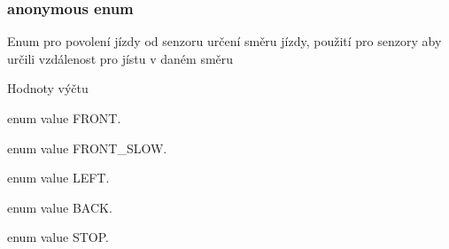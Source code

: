 \subsubsection[{\texorpdfstring{anonymous enum}{anonymous enum}}]{\setlength{\rightskip}{0pt plus 5cm}anonymous enum\hspace{0.3cm}{\ttfamily [private]}}\hypertarget{class_sekacka_a4b9f99f468351377c74f1906012dddce}{}\label{class_sekacka_a4b9f99f468351377c74f1906012dddce}
Enum pro povolení jízdy od senzoru určení směru jízdy, použití pro senzory aby určili vzdálenost pro jístu v daném směru \begin{Desc}
\item[Hodnoty výčtu]\par
\begin{description}
\item[{\em 
F\+R\+O\+NT\hypertarget{class_sekacka_a4b9f99f468351377c74f1906012dddcead823d74f46614cb9d4c6256a47d52427}{}\label{class_sekacka_a4b9f99f468351377c74f1906012dddcead823d74f46614cb9d4c6256a47d52427}
}]enum value F\+R\+O\+NT. \item[{\em 
F\+R\+O\+N\+T\+\_\+\+S\+L\+OW\hypertarget{class_sekacka_a4b9f99f468351377c74f1906012dddcea48ecf5835232244136c4f81df5843716}{}\label{class_sekacka_a4b9f99f468351377c74f1906012dddcea48ecf5835232244136c4f81df5843716}
}]enum value F\+R\+O\+N\+T\+\_\+\+S\+L\+OW. \item[{\em 
L\+E\+FT\hypertarget{class_sekacka_a4b9f99f468351377c74f1906012dddcea84850430a560bac207f0c6c43e5f6db3}{}\label{class_sekacka_a4b9f99f468351377c74f1906012dddcea84850430a560bac207f0c6c43e5f6db3}
}]enum value L\+E\+FT. \item[{\em 
B\+A\+CK\hypertarget{class_sekacka_a4b9f99f468351377c74f1906012dddcea1e7fc60b9bccf54cce66fb95ce4381af}{}\label{class_sekacka_a4b9f99f468351377c74f1906012dddcea1e7fc60b9bccf54cce66fb95ce4381af}
}]enum value B\+A\+CK. \item[{\em 
S\+T\+OP\hypertarget{class_sekacka_a4b9f99f468351377c74f1906012dddcea78fa66f2894ab0692bd2da0aafd67ffd}{}\label{class_sekacka_a4b9f99f468351377c74f1906012dddcea78fa66f2894ab0692bd2da0aafd67ffd}
}]enum value S\+T\+OP. \end{description}
\end{Desc}
